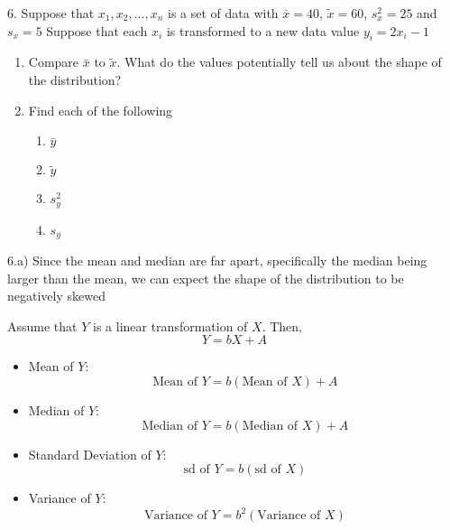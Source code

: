 \documentclass{report}
\begin{document}
    \pagebreak 
    \begin{mdframed}
        6. Suppose that $x_{1}, x_{2}, ..., x_{n}$ is a set of data with $\bar{x}= 40$, $\tilde{x} = 60$, $s_{x}^{2} = 25$ and $s_{x} = 5 $
        Suppose that each $x_{i}$
        is transformed to a new data value $y_{i} = 2x_{i} - 1$
        \begin{enumerate}[label=(\alph*)]
            \item Compare $\bar{x}$ to $\tilde{x}$. What do the values potentially tell us about the shape of the distribution? 
            \item Find each of the following
                \begin{enumerate}[label=(\roman*)]
                    \item $\bar{y}$ 
                    \item $\tilde{y}$
                    \item $s_{y}^{2}$
                    \item $s_{y}$
                \end{enumerate}
        \end{enumerate}
    \end{mdframed}
    \bigbreak \noindent 
    6.a) Since the mean and median are far apart, specifically the median being larger than the mean, we can expect the shape of the distribution to be negatively skewed
    \bigbreak \noindent 
    \begin{remark}
                    Assume that \( Y \) is a linear transformation of \( X \). Then,
            \bigbreak \noindent
            \[
                Y = bX + A
            \]
            \bigbreak \noindent 
            \begin{itemize}
                \item Mean of \( Y \): 
                    \[
                        \text{Mean of } Y = b (\text{Mean of } X) + A
                    \]
                \item Median of \( Y \): 
                    \[
                        \text{Median of } Y = b (\text{Median of } X) + A
                    \]
                \item Standard Deviation of \( Y \): 
                    \[
                        \text{sd of } Y = b (\text{sd of } X)
                    \]
                \item Variance of \( Y \): 
                    \[
                        \text{Variance of } Y = b^2 (\text{Variance of } X)
                    \]
            \end{itemize}
    \end{remark}
\end{document}
